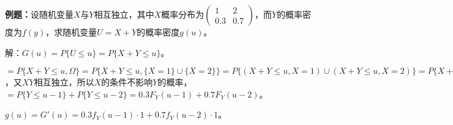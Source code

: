 \documentclass[UTF8, 12pt]{ctexart}
\begin{document}
\textbf{例题：}设随机变量$X$与$Y$相互独立，其中$X$概率分布为$\left(\begin{array}{cc}
    1 & 2 \\
    0.3 & 0.7
\end{array}\right)$，而$Y$的概率密度为$f(y)$，求随机变量$U=X+Y$的概率密度$g(u)$。

解：$G(u)=P\{U\leqslant u\}=P\{X+Y\leqslant u\}$。

$=P\{X+Y\leqslant u,\Omega\}=P\{X+Y\leqslant u,\{X=1\}\cup\{X=2\}\}=P\{(X+Y\leqslant u,X=1)\cup(X+Y\leqslant u,X=2)\}=P\{X+Y\leqslant u,X=1\}+P\{X+Y\leqslant u,X=2\}=P(X=1)P\{X+Y\leqslant u|X=1\}+P(X=2)P\{X+Y\leqslant u|X=2\}=0.3P\{Y\leqslant u-1|X=1\}+0.7P\{Y\leqslant u-2|X=2\}$，又$XY$相互独立，所以$X$的条件不影响$Y$的概率，$=P\{Y\leqslant u-1\}+P\{Y\leqslant u-2\}=0.3F_Y(u-1)+0.7F_Y(u-2)$。

$g(u)=G'(u)=0.3f_Y(u-1)\cdot1+0.7f_Y(u-2)\cdot1$。
\end{document}
